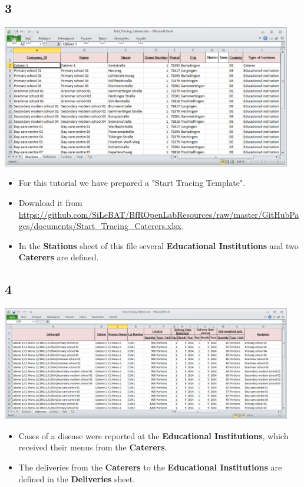 \documentclass{beamer}
\begin{document}
\subsection{3}
\begin{frame}
	\begin{center}
  		\includegraphics[width=0.95\textwidth]{3.png}
	\end{center}
	\begin{itemize}
		\item For this tutorial we have prepared a "Start Tracing Template".
		\item Download it from \url{https://github.com/SiLeBAT/BfROpenLabResources/raw/master/GitHubPages/documents/Start_Tracing_Caterers.xlsx}.
		\item In the \textbf{Stations} sheet of this file several \textbf{Educational Institutions} and two \textbf{Caterers} are defined.
	\end{itemize}
\end{frame}

\subsection{4}
\begin{frame}
	\begin{center}
  		\includegraphics[width=0.95\textwidth]{4.png}
	\end{center}
	\begin{itemize}
		\item Cases of a disease were reported at the \textbf{Educational Institutions}, which received their menus from the \textbf{Caterers}.
		\item The deliveries from the \textbf{Caterers} to the \textbf{Educational Institutions} are defined in the \textbf{Deliveries} sheet.
	\end{itemize}
\end{frame}
\end{document}
